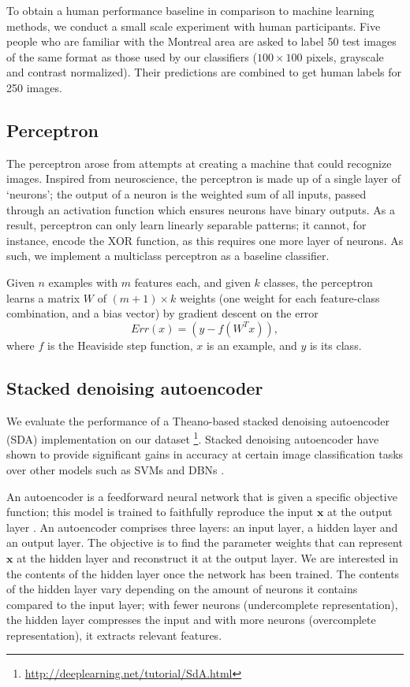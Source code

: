 \documentclass{acm_proc_article-sp}
\begin{document}
To obtain a human performance baseline in comparison to machine learning methods, we conduct a small scale experiment with human participants. Five people who are familiar with the Montreal area are asked to label 50 test images of the same format as those used by our classifiers ($100\times100$ pixels, grayscale and contrast normalized). Their predictions are combined to get human labels for 250 images.

\subsection{Perceptron}
The perceptron arose from attempts at creating a machine that could recognize images.\cite{Bishop}  Inspired from neuroscience, the perceptron is made up of a single layer of `neurons'; the output of a neuron is the weighted sum of all inputs, passed through an activation function which ensures neurons have binary outputs. As a result, perceptron can only learn linearly separable patterns; it cannot, for instance, encode the XOR function, as this requires one more layer of neurons. As such, we implement a multiclass perceptron as a baseline classifier.

Given $n$ examples with $m$ features each, and given $k$ classes, the perceptron learns a matrix $W$ of $(m+1) \times k$ weights (one weight for each feature-class combination, and a bias vector) by gradient descent on the error $$Err(x) = (y - f(W^Tx)),$$
where $f$ is the Heaviside step function, $x$ is an example, and $y$ is its class.

\subsection{Stacked denoising autoencoder} 

We evaluate the performance of a Theano-based stacked denoising autoencoder (SDA) implementation on our dataset \footnote{\url{http://deeplearning.net/tutorial/SdA.html}}. Stacked denoising autoencoder have shown to provide significant gains in accuracy at certain image classification tasks over other models such as SVMs and DBNs \cite{vincent2010}.

An autoencoder is a feedforward neural network that is given a specific objective function; this model is trained to faithfully reproduce the input $\mathbf{x}$ at the output layer \cite{larochelle}. An autoencoder comprises three layers: an input layer, a hidden layer and an output layer. The objective is to find the parameter weights that can represent $\mathbf{x}$ at the hidden layer and reconstruct it at the output layer. We are interested in the contents of the hidden layer once the network has been trained. The contents of the hidden layer vary depending on the amount of neurons it contains compared to the input layer; with fewer neurons (undercomplete representation), the hidden layer compresses the input and with more neurons (overcomplete representation), it extracts relevant features.
\end{document}
